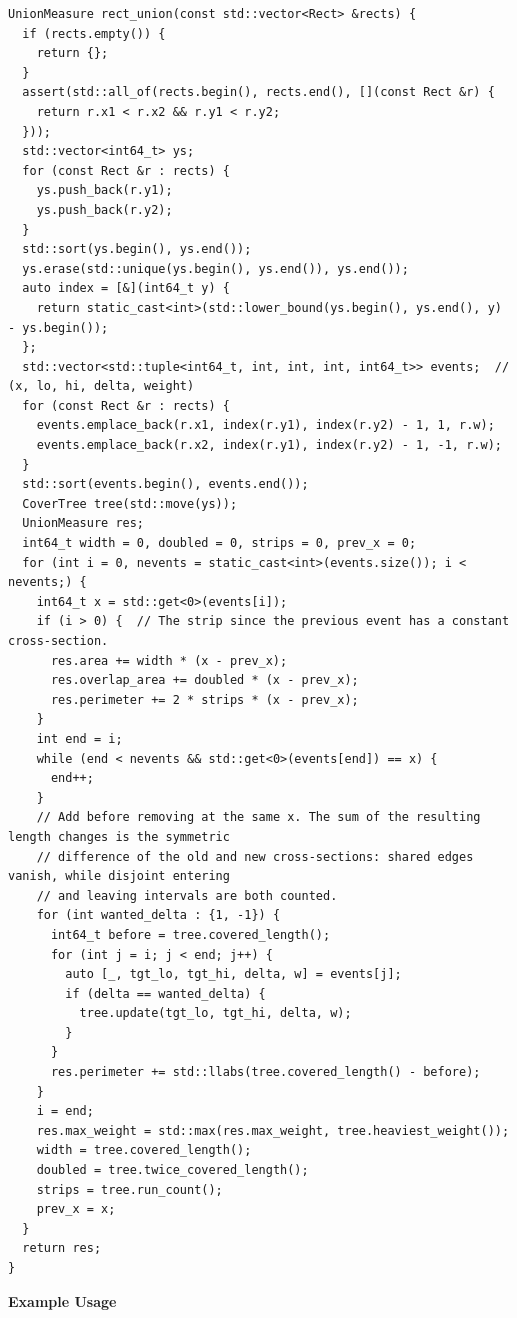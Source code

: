 \begin{lstlisting}[style=cpp]
UnionMeasure rect_union(const std::vector<Rect> &rects) {
  if (rects.empty()) {
    return {};
  }
  assert(std::all_of(rects.begin(), rects.end(), [](const Rect &r) {
    return r.x1 < r.x2 && r.y1 < r.y2;
  }));
  std::vector<int64_t> ys;
  for (const Rect &r : rects) {
    ys.push_back(r.y1);
    ys.push_back(r.y2);
  }
  std::sort(ys.begin(), ys.end());
  ys.erase(std::unique(ys.begin(), ys.end()), ys.end());
  auto index = [&](int64_t y) {
    return static_cast<int>(std::lower_bound(ys.begin(), ys.end(), y) - ys.begin());
  };
  std::vector<std::tuple<int64_t, int, int, int, int64_t>> events;  // (x, lo, hi, delta, weight)
  for (const Rect &r : rects) {
    events.emplace_back(r.x1, index(r.y1), index(r.y2) - 1, 1, r.w);
    events.emplace_back(r.x2, index(r.y1), index(r.y2) - 1, -1, r.w);
  }
  std::sort(events.begin(), events.end());
  CoverTree tree(std::move(ys));
  UnionMeasure res;
  int64_t width = 0, doubled = 0, strips = 0, prev_x = 0;
  for (int i = 0, nevents = static_cast<int>(events.size()); i < nevents;) {
    int64_t x = std::get<0>(events[i]);
    if (i > 0) {  // The strip since the previous event has a constant cross-section.
      res.area += width * (x - prev_x);
      res.overlap_area += doubled * (x - prev_x);
      res.perimeter += 2 * strips * (x - prev_x);
    }
    int end = i;
    while (end < nevents && std::get<0>(events[end]) == x) {
      end++;
    }
    // Add before removing at the same x. The sum of the resulting length changes is the symmetric
    // difference of the old and new cross-sections: shared edges vanish, while disjoint entering
    // and leaving intervals are both counted.
    for (int wanted_delta : {1, -1}) {
      int64_t before = tree.covered_length();
      for (int j = i; j < end; j++) {
        auto [_, tgt_lo, tgt_hi, delta, w] = events[j];
        if (delta == wanted_delta) {
          tree.update(tgt_lo, tgt_hi, delta, w);
        }
      }
      res.perimeter += std::llabs(tree.covered_length() - before);
    }
    i = end;
    res.max_weight = std::max(res.max_weight, tree.heaviest_weight());
    width = tree.covered_length();
    doubled = tree.twice_covered_length();
    strips = tree.run_count();
    prev_x = x;
  }
  return res;
}
\end{lstlisting}
\textbf{Example Usage}\par
